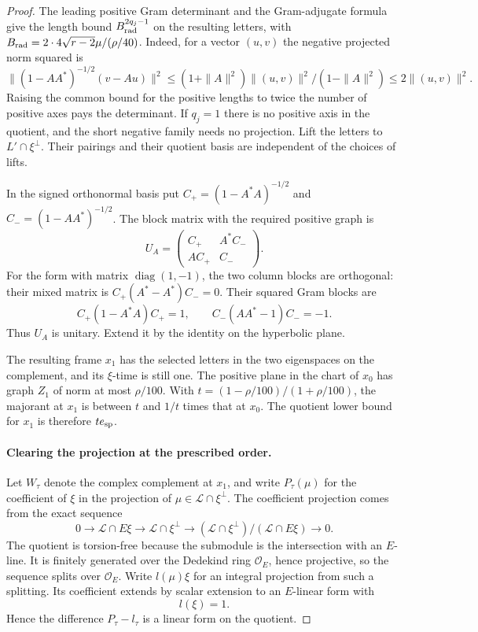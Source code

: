 \begin{proof}
The leading positive Gram determinant
and the Gram-adjugate formula give the length bound
\(B_{\rm rad}^{2q_j-1}\) on the resulting letters, with
\(B_{\rm rad}=2\cdot4\sqrt{r-2}\mu/(\rho/40)\).
Indeed, for a vector \((u,v)\) the negative projected norm
squared is
\[
 \|(1-AA^*)^{-1/2}(v-Au)\|^2\le (1+\|A\|^2)\|(u,v)\|^2/(1-\|A\|^2)\le2\|(u,v)\|^2.
\]
Raising the common bound
for the positive lengths to twice the number of positive
axes pays the determinant. If \(q_j=1\) there is no positive
axis in the quotient, and the short negative family needs
no projection. Lift the letters to \(L'\cap\xi^\perp\).
Their pairings and their quotient basis are independent
of the choices of lifts.

In the signed orthonormal basis put
\(C_+=(1-A^*A)^{-1/2}\) and \(C_-=(1-AA^*)^{-1/2}\).
The block matrix with the required positive graph is
\[
                 U_A=\begin{pmatrix}C_+&A^*C_-\\
                                        AC_+&C_-\end{pmatrix}.
\]
For the form with matrix \(\operatorname{diag}(1,-1)\),
the two column blocks are orthogonal: their mixed matrix
is \(C_+(A^*-A^*)C_-=0\). Their squared Gram blocks are
\[
 C_+(1-A^*A)C_+=1,\qquad C_-(AA^*-1)C_-=-1.
\]
Thus \(U_A\) is unitary. Extend it by the identity on the
hyperbolic plane.

The
resulting frame \(x_1\) has the selected letters in the two
eigenspaces on the complement, and its \(\xi\)-time is still
one. The positive plane in the chart of \(x_0\) has graph
\(Z_1\) of norm at most \(\rho/100\). With
\(t=(1-\rho/100)/(1+\rho/100)\), the majorant at \(x_1\) is
between \(t\) and \(1/t\) times that at \(x_0\). The quotient
lower bound for \(x_1\) is therefore \(t e_{\rm sp}\).

\paragraph{Clearing the projection at the prescribed order.}
Let \(W_\tau\) denote the complex complement at \(x_1\),
and write \(P_\tau(\mu)\) for the coefficient of \(\xi\)
in the projection of \(\mu\in\mathcal L\cap\xi^\perp\).
The coefficient projection comes from the exact sequence
\[
 0\longrightarrow \mathcal L\cap E\xi
 \longrightarrow \mathcal L\cap \xi^\perp
 \longrightarrow
   (\mathcal L\cap\xi^\perp)/(\mathcal L\cap E\xi)
 \longrightarrow 0.
\]
The quotient is torsion-free because the submodule is the
intersection with an \(E\)-line. It is finitely generated over
the Dedekind ring \(\mathcal O_E\), hence projective, so the
sequence splits over \(\mathcal O_E\). Write \(l(\mu)\xi\) for an integral
projection from such a splitting. Its coefficient extends
by scalar extension to an \(E\)-linear form with 
\[
  l(\xi)=1.
\]
Hence the difference \(P_\tau-l_\tau\) is a linear form on
the quotient.


\end{proof}
